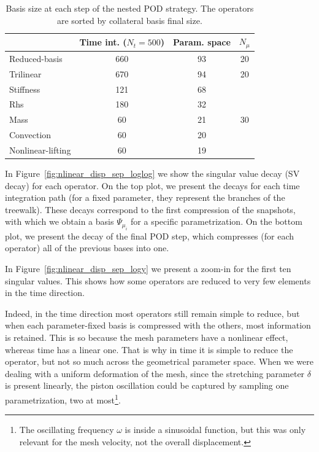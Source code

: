 \documentclass[../../thesis.tex]{subfiles}
\begin{document}
\begin{table}[h]
    \centering
    \caption{Basis size at each step of the nested POD strategy.
    The operators are sorted by collateral basis final size.}
    \begin{tabular}{lccc}
        \toprule
        {} &  Time int. ($N_t = 500$) &  Param. space & $N_{\mu}$ \\
        \midrule
        Reduced-basis     &                     660 &          93 & 20 \\
        \midrule[0.01mm]
        Trilinear         &                     670 &          94 & 20 \\
        Stiffness         &                     121 &          68 & \multirow{5}{*}{30} \\
        Rhs               &                     180 &          32 &  \\
        Mass              &                      60 &          21 &  \\
        Convection        &                      60 &          20 &  \\
        Nonlinear-lifting &                      60 &          19 &  \\
        \bottomrule
    \end{tabular}        
    \label{tab:nlinear_disp_bases_size}
\end{table}
In Figure~\ref{fig:nlinear_disp_sep_loglog} we show 
the singular value decay (SV decay) for each operator.
On the top plot, we present the decays for each time integration path 
(for a fixed parameter, they represent the branches of the treewalk).
These decays correspond to the first compression of the snapshots, 
with which we obtain a basis $\Psi_{\mu_i}$ for a specific parametrization.
On the bottom plot, we present the decay of the final POD step, 
which compresses (for each operator) all of the previous bases into one.

In Figure~\ref{fig:nlinear_disp_sep_logy} we present 
a zoom-in for the first ten singular values.
This shows how some operators are reduced 
to very few elements in the time direction.

Indeed, in the time direction most operators still remain simple to reduce, 
but when each parameter-fixed basis is compressed with the others,
most information is retained.
This is so because the mesh parameters have a nonlinear effect, 
whereas time has a linear one.
That is why in time it is simple to reduce the operator,
but not so much across the geometrical parameter space.
When we were dealing with a uniform deformation of the mesh,
since the stretching parameter $\delta$ is present linearly,
the piston oscillation could be captured by sampling one parametrization,
two at most\footnote{The oscillating frequency $\omega$ is inside a sinusoidal function,
but this was only relevant for the mesh velocity, 
not the overall displacement.}.
\end{document}
